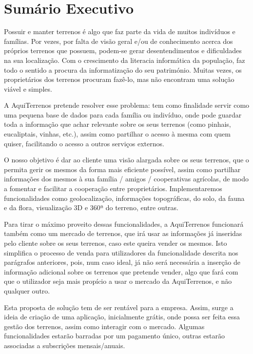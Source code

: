 \documentclass[11pt]{article}
\begin{document}
	
	
	\tableofcontents
	\pagebreak
	
	\large
	\section{Sumário Executivo}
	
	\normalsize
	
	Possuir e manter terrenos é algo que faz parte da vida de muitos indivíduos e famílias. Por vezes, por falta de visão geral e/ou de conhecimento acerca dos próprios terrenos que possuem, podem-se gerar desentendimentos e dificuldades na sua localização. Com o crescimento da literacia informática da população, faz todo o sentido a procura da informatização do seu património. Muitas vezes, os proprietários dos terrenos procuram fazê-lo, mas não encontram uma solução viável e simples.
	
	A AquiTerrenos pretende resolver esse problema: tem como finalidade servir como uma pequena base de dados para cada família ou indivíduo, onde pode guardar toda a informação que achar relevante sobre os seus terrenos (como pinhais, eucaliptais, vinhas, etc.), assim como partilhar o acesso à mesma com quem quiser, facilitando o acesso a outros serviços externos.
	
	O nosso objetivo é dar ao cliente uma visão alargada sobre os seus terrenos, que o permita gerir os mesmos da forma mais eficiente possível, assim como partilhar informações dos mesmos à sua família / amigos / cooperativas agrícolas, de modo a fomentar e facilitar a cooperação entre proprietários. Implementaremos funcionalidades como geolocalização, informações topográficas, do solo, da fauna e da flora, visualização 3D e 360ª do terreno, entre outras.
	
	Para tirar o máximo proveito dessas funcionalidades, a AquiTerrenos funcionará também como um mercado de terrenos, que irá usar as informações já inseridas pelo cliente sobre os seus terrenos, caso este queira vender os mesmos. Isto simplifica o processo de venda para utilizadores da funcionalidade descrita nos parágrafos anteriores, pois, num caso ideal, já não será necessária a inserção de informação adicional sobre os terrenos que pretende vender, algo que fará com que o utilizador seja mais propício a usar o mercado da AquiTerrenos, e não qualquer outro.
	
	Esta proposta de solução tem de ser rentável para a empresa. Assim, surge a ideia de criação de uma aplicação, inicialmente grátis, onde possa ser feita essa gestão dos terrenos, assim como interagir com o mercado. Algumas funcionalidades estarão barradas por um pagamento único, outras estarão associadas a subscrições mensais/anuais.
	
\end{document}
